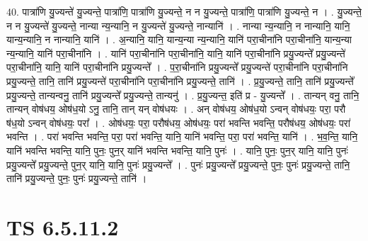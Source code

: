 \documentclass[17pt]{extarticle}
\begin{document}
40. पात्रा॑णि यु॒ज्यन्ते॑ यु॒ज्यन्ते॒ पात्रा॑णि॒ पात्रा॑णि यु॒ज्यन्ते॒ न न यु॒ज्यन्ते॒ पात्रा॑णि॒ पात्रा॑णि यु॒ज्यन्ते॒ न । . यु॒ज्यन्ते॒ न न यु॒ज्यन्ते॑ यु॒ज्यन्ते॒ नान्या न्य॒न्यानि॒ न यु॒ज्यन्ते॑ यु॒ज्यन्ते॒ नान्यानि॑ । . नान्या न्य॒न्यानि॒ न नान्यानि॒ यानि॒ यान्य॒न्यानि॒ न नान्यानि॒ यानि॑ । . अ॒न्यानि॒ यानि॒ यान्य॒न्या न्य॒न्यानि॒ यानि॑ परा॒चीना॑नि परा॒चीना॑नि॒ यान्य॒न्या न्य॒न्यानि॒ यानि॑ परा॒चीना॑नि । . यानि॑ परा॒चीना॑नि परा॒चीना॑नि॒ यानि॒ यानि॑ परा॒चीना॑नि प्रयु॒ज्यन्ते᳚ प्रयु॒ज्यन्ते॑ परा॒चीना॑नि॒ यानि॒ यानि॑ परा॒चीना॑नि प्रयु॒ज्यन्ते᳚ । . प॒रा॒चीना॑नि प्रयु॒ज्यन्ते᳚ प्रयु॒ज्यन्ते॑ परा॒चीना॑नि परा॒चीना॑नि प्रयु॒ज्यन्ते॒ तानि॒ तानि॑ प्रयु॒ज्यन्ते॑ परा॒चीना॑नि परा॒चीना॑नि प्रयु॒ज्यन्ते॒ तानि॑ । . प्र॒यु॒ज्यन्ते॒ तानि॒ तानि॑ प्रयु॒ज्यन्ते᳚ प्रयु॒ज्यन्ते॒ तान्यन्वनु॒ तानि॑ प्रयु॒ज्यन्ते᳚ प्रयु॒ज्यन्ते॒ तान्यनु॑ । . प्र॒यु॒ज्यन्त॒ इति॑ प्र - यु॒ज्यन्ते᳚ । . तान्यन् वनु॒ तानि॒ तान्यन् वोष॑धय॒ ओष॑ध॒यो ऽनु॒ तानि॒ तान् यन् वोष॑धयः । . अन् वोष॑धय॒ ओष॑ध॒यो ऽन्वन् वोष॑धयः॒ परा॒ परौ ष॑ध॒यो ऽन्वन् वोष॑धयः॒ परा᳚ । . ओष॑धयः॒ परा॒ परौष॑धय॒ ओष॑धयः॒ परा॑ भवन्ति भवन्ति॒ परौष॑धय॒ ओष॑धयः॒ परा॑ भवन्ति । . परा॑ भवन्ति भवन्ति॒ परा॒ परा॑ भवन्ति॒ यानि॒ यानि॑ भवन्ति॒ परा॒ परा॑ भवन्ति॒ यानि॑ । . भ॒व॒न्ति॒ यानि॒ यानि॑ भवन्ति भवन्ति॒ यानि॒ पुनः॒ पुन॒र् यानि॑ भवन्ति भवन्ति॒ यानि॒ पुनः॑ । . यानि॒ पुनः॒ पुन॒र् यानि॒ यानि॒ पुनः॑ प्रयु॒ज्यन्ते᳚ प्रयु॒ज्यन्ते॒ पुन॒र् यानि॒ यानि॒ पुनः॑ प्रयु॒ज्यन्ते᳚ । . पुनः॑ प्रयु॒ज्यन्ते᳚ प्रयु॒ज्यन्ते॒ पुनः॒ पुनः॑ प्रयु॒ज्यन्ते॒ तानि॒ तानि॑ प्रयु॒ज्यन्ते॒ पुनः॒ पुनः॑ प्रयु॒ज्यन्ते॒ तानि॑ । \newline
\pagebreak
{}

\section{ TS 6.5.11.2 }
\end{document}

